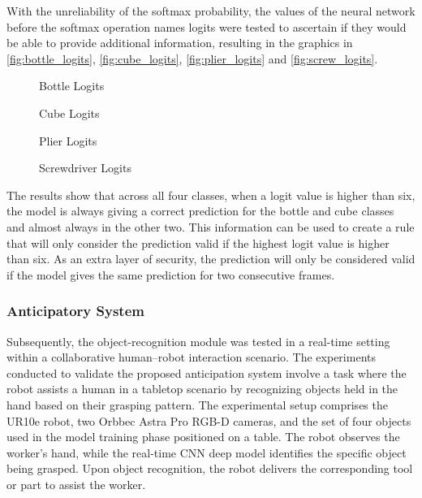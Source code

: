 With the unreliability of the softmax probability, the values of the neural network before the softmax operation names logits were tested to ascertain if they would be able to provide additional information, resulting in the graphics in \autoref{fig:bottle_logits}, \autoref{fig:cube_logits}, \autoref{fig:plier_logits} and \autoref{fig:screw_logits}.

\begin{figure}[H]
    \centering
    {\fontsize{9}{11}\selectfont}
    \caption{Bottle Logits}
    \label{fig:bottle_logits}
\end{figure}

\begin{figure}[H]
    \centering
    {\fontsize{9}{11}\selectfont}
    \caption{Cube Logits}
    \label{fig:cube_logits}
\end{figure}

\begin{figure}[H]
    \centering
    {\fontsize{9}{11}\selectfont}
    \caption{Plier Logits}
    \label{fig:plier_logits}
\end{figure}

\begin{figure}[H]
    \centering
    {\fontsize{9}{11}\selectfont}
    \caption{Screwdriver Logits}
    \label{fig:screw_logits}
\end{figure}

The results show that across all four classes, when a logit value is higher than six, the model is always giving a correct prediction for the bottle and cube classes and almost always in the other two. This information can be used to create a rule that will only consider the prediction valid if the highest logit value is higher than six. As an extra layer of security, the prediction will only be considered valid if the model gives the same prediction for two consecutive frames.

\subsubsection{Anticipatory System}

Subsequently, the object-recognition module was tested in a real-time setting within a collaborative human–robot interaction scenario. The experiments conducted to validate the proposed anticipation system involve a task where the robot assists a human in a tabletop scenario by recognizing objects held in the hand based on their grasping pattern. The experimental setup comprises the UR10e robot, two Orbbec Astra Pro RGB-D cameras, and the set of four objects used in the model training phase positioned on a table. The robot observes the worker’s hand, while the real-time CNN deep model identifies the specific object being grasped. Upon object recognition, the robot delivers the corresponding tool or part to assist the worker.

